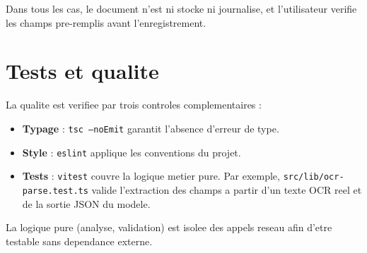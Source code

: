 \documentclass[11pt,a4paper]{article}
\begin{document}
\begin{center}
\end{center}

Dans tous les cas, le document n'est ni stocke ni journalise, et l'utilisateur
verifie les champs pre-remplis avant l'enregistrement.

\section{Tests et qualite}
La qualite est verifiee par trois controles complementaires :
\begin{itemize}[leftmargin=1.4em]
  \item \textbf{Typage} : \texttt{tsc --noEmit} garantit l'absence d'erreur de type.
  \item \textbf{Style} : \texttt{eslint} applique les conventions du projet.
  \item \textbf{Tests} : \texttt{vitest} couvre la logique metier pure. Par exemple, \texttt{src/lib/ocr-parse.test.ts} valide l'extraction des champs a partir d'un texte OCR reel et de la sortie JSON du modele.
\end{itemize}
La logique pure (analyse, validation) est isolee des appels reseau afin d'etre
testable sans dependance externe.

\end{document}
